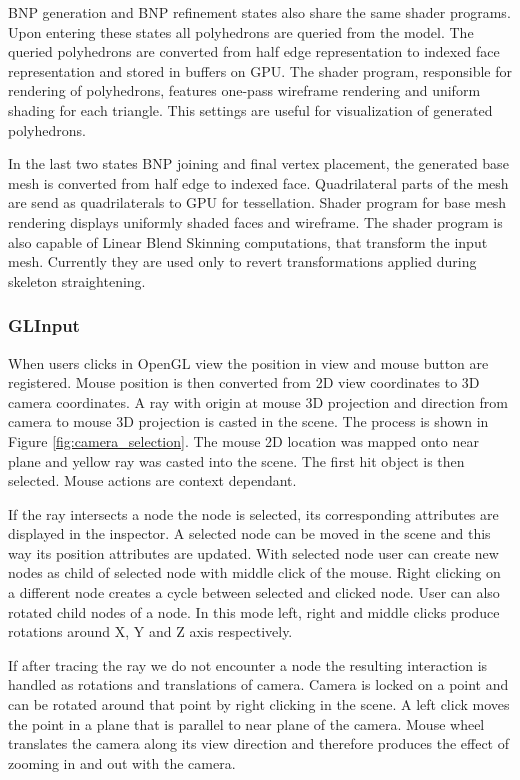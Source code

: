 BNP generation and BNP refinement states also share the same shader programs.
Upon entering these states all polyhedrons are queried from the model.
The queried polyhedrons are converted from half edge representation to indexed face representation and stored in buffers on GPU.
The shader program, responsible for rendering of polyhedrons, features one-pass wireframe rendering and uniform shading for each triangle.
This settings are useful for visualization of generated polyhedrons.

In the last two states BNP joining and final vertex placement, the generated base mesh is converted from half edge to indexed face.
Quadrilateral parts of the mesh are send as quadrilaterals to GPU for tessellation.
Shader program for base mesh rendering displays uniformly shaded faces and wireframe.
The shader program is also capable of Linear Blend Skinning computations, that transform the input mesh.
Currently they are used only to revert transformations applied during skeleton straightening.

\subsubsection{GLInput}

When users clicks in OpenGL view the position in view and mouse button are registered.
Mouse position is then converted from 2D view coordinates to 3D camera coordinates.
A ray with origin at mouse 3D projection and direction from camera to mouse 3D projection is casted in the scene.
The process is shown in Figure \ref{fig:camera_selection}.
The mouse 2D location was mapped onto near plane and yellow ray was casted into the scene.
The first hit object is then selected.
Mouse actions are context dependant.

If the ray intersects a node the node is selected, its corresponding attributes are displayed in the inspector.
A selected node can be moved in the scene and this way its position attributes are updated.
With selected node user can create new nodes as child of selected node with middle click of the mouse.
Right clicking on a different node creates a cycle between selected and clicked node.
User can also rotated child nodes of a node.
In this mode left, right and middle clicks produce rotations around X, Y and Z axis respectively.

If after tracing the ray we do not encounter a node the resulting interaction is handled as rotations and translations of camera.
Camera is locked on a point and can be rotated around that point by right clicking in the scene.
A left click moves the point in a plane that is parallel to near plane of the camera.
Mouse wheel translates the camera along its view direction and therefore produces the effect of zooming in and out with the camera.

